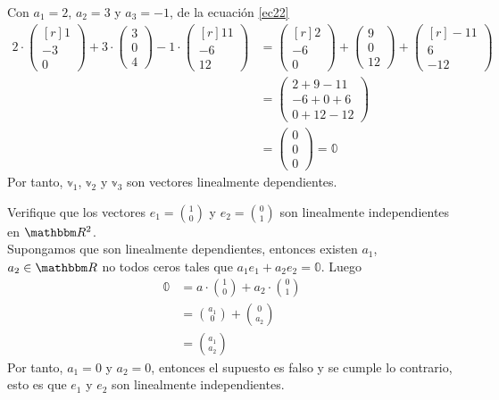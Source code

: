 \begin{example}
    Con $a_1 = 2$, $a_2 = 3$ y $a_3 = -1$, de la ecuación \eqref{ec22}
    \begin{align*}
        2 \cdot \begin{pmatrix*}[r] 1 \\ -3 \\ 0 \end{pmatrix*} + 3 \cdot \begin{pmatrix} 3 \\ 0 \\ 4 \end{pmatrix} - 1 \cdot \begin{pmatrix*}[r] 11 \\ -6 \\ 12 \end{pmatrix*} & = \begin{pmatrix*}[r] 2 \\ -6 \\ 0 \end{pmatrix*} + \begin{pmatrix} 9 \\ 0 \\ 12 \end{pmatrix} + \begin{pmatrix*}[r] -11 \\ 6 \\ -12 \end{pmatrix*} \\
        & = \begin{pmatrix} 2+9-11 \\ -6+0+6 \\ 0+12-12 \end{pmatrix} \\
        & = \begin{pmatrix} 0 \\ 0 \\ 0 \end{pmatrix} = \mathbb{0}
    \end{align*}
    Por tanto, $\mathbb{v}_1$, $\mathbb{v}_2$ y $\mathbb{v}_3$ son vectores linealmente dependientes.
\end{example}

\begin{example}
    Verifique que los vectores $\displaystyle e_1 = \binom{1}{0}$ y $\displaystyle e_2 = \binom{0}{1}$ son linealmente independientes en $\RR[2]$. \\
    \solucion Supongamos que son linealmente dependientes, entonces existen $a_1$, $a_2 \in \RR$ no todos ceros tales que $a_1e_1 + a_2e_2 = \mathbb{0}$. Luego
    \begin{align*}
        \mathbb{0} & = a \cdot \binom{1}{0} + a_2 \cdot \binom{0}{1} \\
        & = \binom{a_1}{0} + \binom{0}{a_2} \\
        & = \binom{a_1}{a_2}
    \end{align*}
    Por tanto, $a_1 = 0$ y $a_2 = 0$, entonces el supuesto es falso y se cumple lo contrario, esto es que $e_1$ y $e_2$ son linealmente independientes.
\end{example}


